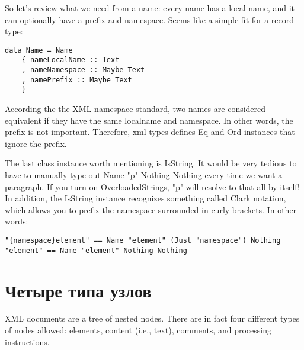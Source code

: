 So let's review what we need from a name: every name has a local name, and it can optionally have a prefix and namespace. Seems like a simple fit for a record type:

\begin{lstlisting}
data Name = Name
    { nameLocalName :: Text
    , nameNamespace :: Maybe Text
    , namePrefix :: Maybe Text
    }
\end{lstlisting}

According the the XML namespace standard, two names are considered equivalent if they have the same localname and namespace. In other words, the prefix is not important. Therefore, xml-types defines Eq and Ord instances that ignore the prefix.

The last class instance worth mentioning is IsString. It would be very tedious to have to manually type out Name "p" Nothing Nothing every time we want a paragraph. If you turn on OverloadedStrings, "p" will resolve to that all by itself! In addition, the IsString instance recognizes something called Clark notation, which allows you to prefix the namespace surrounded in curly brackets. In other words:

\begin{lstlisting}
"{namespace}element" == Name "element" (Just "namespace") Nothing
"element" == Name "element" Nothing Nothing
\end{lstlisting}

\section{Четыре типа узлов} %

XML documents are a tree of nested nodes. There are in fact four different types of nodes allowed: elements, content (i.e., text), comments, and processing instructions.



